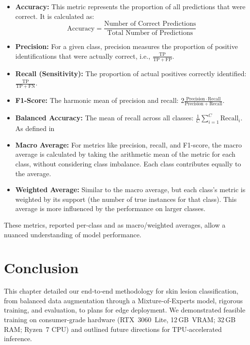 \begin{itemize}
    \item \textbf{Accuracy:} This metric represents the proportion of all predictions that were correct. It is calculated as:
    \begin{equation}
        \text{Accuracy} = \frac{\text{Number of Correct Predictions}}{\text{Total Number of Predictions}}
    \end{equation}

    \item \textbf{Precision:} For a given class, precision measures the proportion of positive identifications that were actually correct, i.e., $\frac{\mathrm{TP}}{\mathrm{TP}+\mathrm{FP}}$.

    \item \textbf{Recall (Sensitivity):} The proportion of actual positives correctly identified: $\frac{\mathrm{TP}}{\mathrm{TP}+\mathrm{FN}}$.

    \item \textbf{F1-Score:} The harmonic mean of precision and recall: $2\frac{\mathrm{Precision}\cdot\mathrm{Recall}}{\mathrm{Precision}+\mathrm{Recall}}$.

    \item \textbf{Balanced Accuracy:} The mean of recall across all classes: $\frac{1}{C}\sum_{i=1}^{C}\mathrm{Recall}_i$.
    As defined in \cite{litjens2017survey}

    \item \textbf{Macro Average:} For metrics like precision, recall, and F1-score, the macro average is calculated by taking the arithmetic mean of the metric for each class, without considering class imbalance. Each class contributes equally to the average.

    \item \textbf{Weighted Average:} Similar to the macro average, but each class's metric is weighted by its support (the number of true instances for that class). This average is more influenced by the performance on larger classes.

\end{itemize}

These metrics, reported per-class and as macro/weighted averages, allow a nuanced understanding of model performance.



\section{Conclusion}
This chapter detailed our end‑to‑end methodology for skin lesion classification, from balanced data augmentation through a Mixture‑of‑Experts model, rigorous training, and evaluation, to plans for edge deployment. We demonstrated feasible training on consumer‑grade hardware (RTX 3060 Lite, 12 GB VRAM; 32 GB RAM; Ryzen 7 CPU) and outlined future directions for TPU‑accelerated inference.

